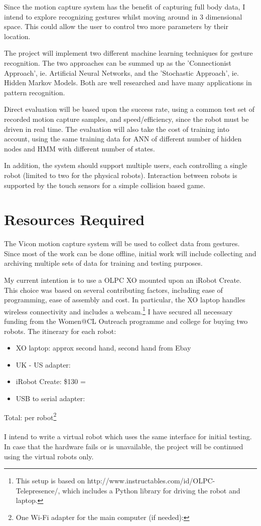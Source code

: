 Since the motion capture system has the benefit of capturing full body data, I intend to explore recognizing gestures whilst moving around in 3 dimensional space. This could allow the user to control two more parameters by their location.

The project will implement two different machine learning techniques for gesture recognition. The two approaches can be summed up as the 'Connectionist Approach', ie. Artificial Neural Networks, and the 'Stochastic Approach', ie. Hidden Markov Models. Both are well researched and have many applications in pattern recognition. 

Direct evaluation will be based upon the success rate, using a common test set of recorded motion capture samples, and speed/efficiency, since the robot must be driven in real time. The evaluation will also take the cost of training into account, using the same training data for ANN of different number of hidden nodes and HMM with different number of states.

In addition, the system should support multiple users, each controlling a single robot (limited to two for the physical robots). Interaction between robots is supported by the touch sensors for a simple collision based game.

\section*{Resources Required}

The Vicon motion capture system will be used to collect data from gestures. Since most of the work can be done offline, initial work will include collecting and archiving multiple sets of data for training and testing purposes.

My current intention is to use a OLPC XO mounted upon an iRobot Create. This choice was based on several contributing factors, including ease of programming, ease of assembly and cost. In particular, the XO laptop handles wireless connectivity and includes a webcam.\footnote{This setup is based on http://www.instructables.com/id/OLPC-Telepresence/, which includes a Python library for driving the robot and laptop.} I have secured all necessary funding from the Women@CL Outreach programme and college for buying two robots. The itinerary for each robot:
\begin{itemize}
\item XO laptop: approx  second hand, second hand from Ebay
\item UK - US adapter: 
\item iRobot Create: \$130 = 
\item USB to serial adapter: 
\end{itemize}
Total:  per robot\footnote{One Wi-Fi adapter for the main computer (if needed): }
\\ \\
I intend to write a virtual robot which uses the same interface for initial testing. In case that the hardware fails or is unavailable, the project will be continued using the virtual robots only.

